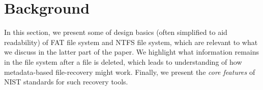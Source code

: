 \section{Background}

\begin{paraphrase}
 In this section, we present some of design basics (often simplified to aid readability) of FAT file system and NTFS file system, 
which are relevant to what we discuss in the latter part of the paper. 
We highlight what information remains in the file system after a file is deleted, 
which leads to understanding of how metadata-based file-recovery might work. 
Finally, we present the \emph{core features} of NIST standards for such recovery tools.  
\end{paraphrase}




